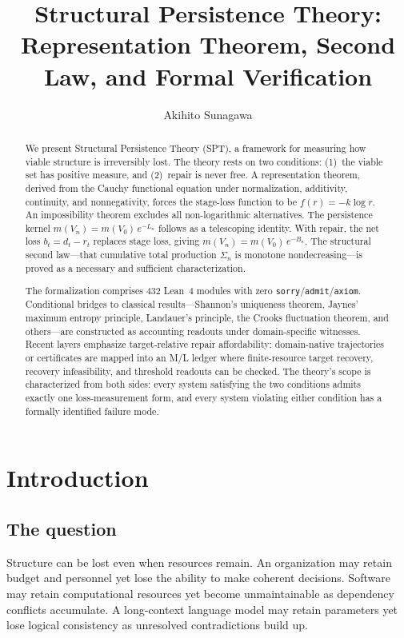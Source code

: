 \documentclass[11pt,a4paper]{article}
\title{Structural Persistence Theory:\\
Representation Theorem, Second Law, and Formal Verification}
\author{Akihito Sunagawa}
\date{}
\begin{document}
\maketitle

\begin{abstract}
We present Structural Persistence Theory (SPT), a framework for measuring how viable structure is irreversibly lost. The theory rests on two conditions: (1)~the viable set has positive measure, and (2)~repair is never free. A representation theorem, derived from the Cauchy functional equation under normalization, additivity, continuity, and nonnegativity, forces the stage-loss function to be $f(r)=-k\log r$. An impossibility theorem excludes all non-logarithmic alternatives. The persistence kernel $m(V_n)=m(V_0)\,e^{-L_n}$ follows as a telescoping identity. With repair, the net loss $b_t=d_t-r_t$ replaces stage loss, giving $m(V_n)=m(V_0)\,e^{-B_n}$. The structural second law---that cumulative total production $\Sigma_n$ is monotone nondecreasing---is proved as a necessary and sufficient characterization.

The formalization comprises 432 Lean~4 modules with zero \texttt{sorry}/\texttt{admit}/\texttt{axiom}. Conditional bridges to classical results---Shannon's uniqueness theorem, Jaynes' maximum entropy principle, Landauer's principle, the Crooks fluctuation theorem, and others---are constructed as accounting readouts under domain-specific witnesses. Recent layers emphasize target-relative repair affordability: domain-native trajectories or certificates are mapped into an M/L ledger where finite-resource target recovery, recovery infeasibility, and threshold readouts can be checked. The theory's scope is characterized from both sides: every system satisfying the two conditions admits exactly one loss-measurement form, and every system violating either condition has a formally identified failure mode.
\end{abstract}

\section{Introduction}

\subsection{The question}

Structure can be lost even when resources remain. An organization may retain budget and personnel yet lose the ability to make coherent decisions. Software may retain computational resources yet become unmaintainable as dependency conflicts accumulate. A long-context language model may retain parameters yet lose logical consistency as unresolved contradictions build up.
\end{document}

